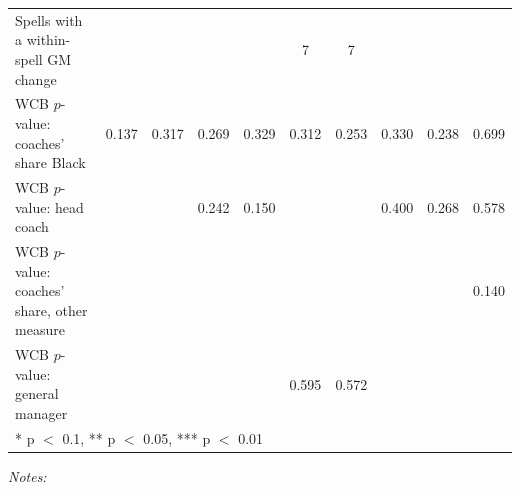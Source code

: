 \begin{table}[!h]
{\begin{threeparttable}
\begin{tabular}[t]{lccccccccc}
Spells with a within-spell GM change &  &  &  &  & 7 & 7 &  &  & \\
WCB $p$-value: coaches' share Black & 0.137 & 0.317 & 0.269 & 0.329 & 0.312 & 0.253 & 0.330 & 0.238 & 0.699\\
WCB $p$-value: head coach &  &  & 0.242 & 0.150 &  &  & 0.400 & 0.268 & 0.578\\
WCB $p$-value: coaches' share, other measure &  &  &  &  &  &  &  &  & 0.140\\
WCB $p$-value: general manager &  &  &  &  & 0.595 & 0.572 &  &  & \\
\bottomrule
\multicolumn{10}{l}{\rule{0pt}{1em}* p $<$ 0.1, ** p $<$ 0.05, *** p $<$ 0.01}\\
\end{tabular}
\begin{tablenotes}[para]
\item \textit{Notes:} 

\end{tablenotes}
\end{threeparttable}}
\end{table}

